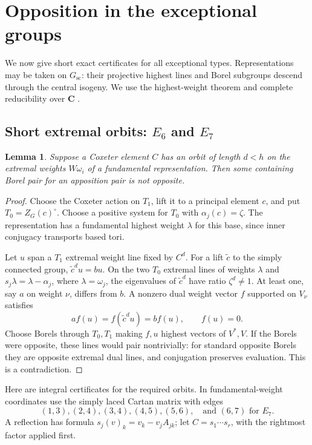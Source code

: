 \documentclass[11pt]{article}
\newcommand{\C}{\mathbf C}\newcommand{\Z}{\mathbf Z}\newcommand{\Q}{\mathbf Q}
\newtheorem{lemma}[theorem]{Lemma}
\theoremstyle{definition}\newtheorem{definition}[theorem]{Definition}
\theoremstyle{remark}\newtheorem{remark}[theorem]{Remark}
\begin{document}
\section{Opposition in the exceptional groups}\label{sec:exceptional}
We now give short exact certificates for all exceptional types. Representations may be taken on $G_{\mathrm{sc}}$: their projective highest lines and Borel subgroups descend through the central isogeny. We use the highest-weight theorem and complete reducibility over $\C$ \citep[Proposition~22.17, Theorems~22.18--22.20, pp.~467--468; Proposition~22.41, p.~477]{Milne2017}.

\subsection{Short extremal orbits: \texorpdfstring{$E_6$ and $E_7$}{E6 and E7}}
\begin{lemma}\label{lem:short}
Suppose a Coxeter element $C$ has an orbit of length $d<h$ on the extremal weights $W\omega_i$ of a fundamental representation. Then some containing Borel pair for an apposition pair is not opposite.
\end{lemma}
\begin{proof}
Choose the Coxeter action on $T_1$, lift it to a principal element $c$, and put $T_0=Z_G(c)^\circ$. Choose a positive system for $T_0$ with $\alpha_j(c)=\zeta$. The representation has a fundamental highest weight $\lambda$ for this base, since inner conjugacy transports based tori.

Let $u$ span a $T_1$ extremal weight line fixed by $C^d$. For a lift $\widetilde c$ to the simply connected group, $\widetilde c^d u=bu$. On the two $T_0$ extremal lines of weights $\lambda$ and $s_j\lambda=\lambda-\alpha_j$, where $\lambda=\omega_j$, the eigenvalues of $\widetilde c^d$ have ratio $\zeta^d\ne1$. At least one, say $a$ on weight $\nu$, differs from $b$. A nonzero dual weight vector $f$ supported on $V_\nu$ satisfies
\[
 a f(u)=f(\widetilde c^d u)=b f(u),\qquad f(u)=0.
\]
Choose Borels through $T_0,T_1$ making $f,u$ highest vectors of $V^*,V$. If the Borels were opposite, these lines would pair nontrivially: for standard opposite Borels they are opposite extremal dual lines, and conjugation preserves evaluation. This is a contradiction.
\end{proof}

Here are integral certificates for the required orbits. In fundamental-weight coordinates use the simply laced Cartan matrix with edges
\[
 (1,3),(2,4),(3,4),(4,5),(5,6),
 \quad\text{and }(6,7)\text{ for }E_7.
\]
A reflection has formula $s_j(v)_k=v_k-v_jA_{jk}$; let $C=s_1\cdots s_r$, with the rightmost factor applied first.
\end{document}
